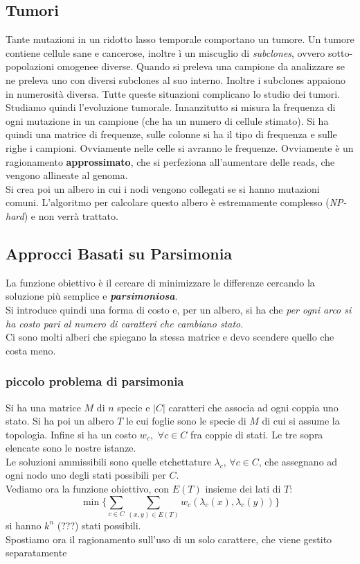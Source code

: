 \documentclass[a4paper,12pt, oneside]{book}
\begin{document}
\subsection{Tumori}
Tante mutazioni in un ridotto lasso temporale comportano un tumore.
Un tumore contiene cellule sane e cancerose, inoltre ì un miscuglio di
\textit{subclones}, ovvero sotto-popolazioni omogenee diverse. Quando
si preleva una campione da analizzare se ne preleva uno con diversi
subclones al suo interno. Inoltre i subclones appaiono in numerosità
diversa. Tutte queste situazioni complicano lo studio dei tumori.\\
Studiamo quindi l'evoluzione tumorale. Innanzitutto si misura la
frequenza di ogni mutazione in un campione (che ha un numero di
cellule stimato). Si ha quindi una matrice di frequenze, sulle colonne
si ha il tipo di frequenza e sulle righe i campioni. Ovviamente nelle
celle si avranno le frequenze. Ovviamente è un ragionamento
\textbf{approssimato}, che si perfeziona all'aumentare delle reads,
che vengono allineate al genoma.\\
Si crea poi un albero in cui i nodi vengono collegati se si hanno
mutazioni comuni. L'algoritmo per calcolare questo albero è
estremamente complesso (\textit{NP-hard}) e non verrà trattato. 
\subsection{Approcci Basati su Parsimonia}
La funzione obiettivo è il cercare di minimizzare le differenze
cercando la soluzione più semplice e \textbf{\textit{parsimoniosa}}.\\
Si introduce quindi una forma di costo e, per un albero, si ha che
\textit{per ogni arco si ha costo pari al numero di caratteri che
  cambiano stato}.\\
Ci sono molti alberi che spiegano la stessa matrice e devo scendere
quello che costa meno.
\subsubsection{piccolo problema di parsimonia}
Si ha una matrice $M$ di $n$ specie e $|C|$ caratteri che
associa ad ogni coppia uno stato. Si ha poi un albero $T$ le cui
foglie sono le specie di $M$ di cui si assume la topologia. Infine si
ha un costo $w_c,\,\,\forall c\in C$ fra coppie 
di stati. Le tre sopra elencate sono le nostre istanze. \\
Le soluzioni ammissibili sono quelle etchettature $\lambda_c$,
$\forall c\in C$, che assegnano ad ogni nodo uno degli stati
possibili per $C$.\\
Vediamo ora la funzione obiettivo, con $E(T)$ insieme dei lati di $T$:
\[\min\{\sum_{c\in C}\sum_{(x,y)\in
    E(T)}w_c(\lambda_c(x),\lambda_c(y))\}\]
si hanno $k^n$ (???) stati possibili.\\
Spostiamo ora il ragionamento sull'uso di un solo carattere, che viene
gestito separatamente
\end{document}
